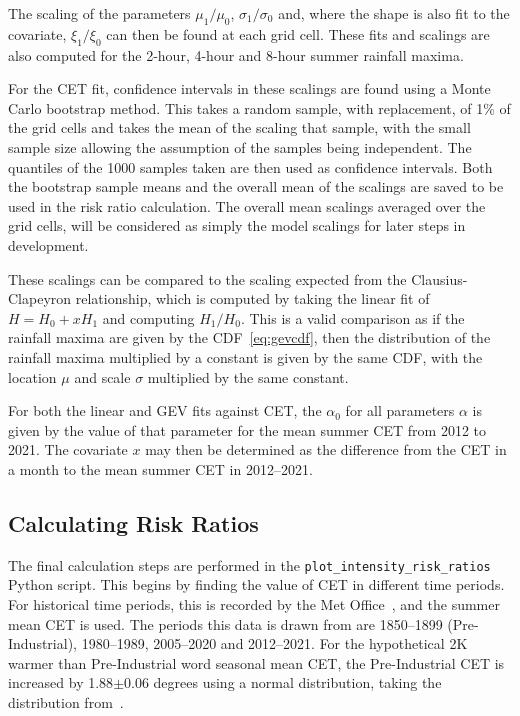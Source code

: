 The scaling of the parameters $\mu_1 / \mu_0$, $\sigma_1 / \sigma_0$ and, where the shape is also fit to the covariate,
    $\xi_1 / \xi_0$ can then be found at each grid cell.
These fits and scalings are also computed for the 2-hour, 4-hour and 8-hour summer rainfall maxima.

For the CET fit,
    confidence intervals in these scalings are found using a Monte Carlo bootstrap method.
This takes a random sample, with replacement, of 1\% of the grid cells and takes the mean of the scaling that sample,
    with the small sample size allowing the assumption of the samples being independent.
The quantiles of the 1000 samples taken are then used as confidence intervals.
Both the bootstrap sample means and the overall mean of the scalings are saved to be used in the risk ratio calculation.
The overall mean scalings
    averaged over the grid cells,
    will be considered as simply the model scalings for later steps in development.

These scalings can be compared to the scaling expected from the Clausius-Clapeyron relationship,
    which is computed by taking the linear fit of $H = H_0 + xH_1$ and computing $H_1 / H_0$.
This is a valid comparison as if the rainfall maxima are given by the CDF~\ref{eq:gevcdf},
    then the distribution of the rainfall maxima multiplied by a constant is given by the same CDF,
    with the location $\mu$ and scale $\sigma$ multiplied by the same constant.

For both the linear and GEV fits against CET, the $\alpha_0$ for all parameters $\alpha$ is given by the value of that parameter for
    the mean summer CET from 2012 to 2021.
The covariate $x$ may then be determined as the difference from the CET in a month to the mean summer CET in 2012--2021.

\subsection{Calculating Risk Ratios}\label{subsec:riskratios}

The final calculation steps are performed in the \texttt{plot\_intensity\_risk\_ratios}~\cite{Me_Code} Python script.
This begins by finding the value of CET in different time periods.
For historical time periods,
    this is recorded by the Met Office~\cite{CET},
    and the summer mean CET is used.
The periods this data is drawn from are 1850--1899 (Pre-Industrial),
    1980--1989, 2005--2020 and 2012--2021.
For the hypothetical 2K warmer than Pre-Industrial word seasonal mean CET,
    the Pre-Industrial CET is increased by 1.88$\pm$0.06 degrees using a normal distribution,
    taking the distribution from~\cite{Tett_Soon}.


